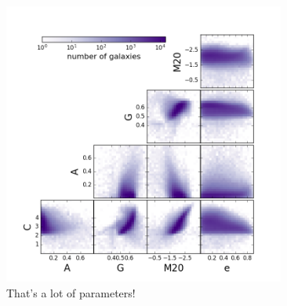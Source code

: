 \documentclass[twocolumn]{aastex6}
\newcommand\aastex{AAS\TeX}
\begin{document}
\begin{figure}[t!]
\includegraphics[width=3.65in]{figures/morph_params_entire_GZ2_sample.png}
\caption{That's a lot of parameters! \label{fig: machine classified}}
\end{figure}











\listofchanges
\end{document}
